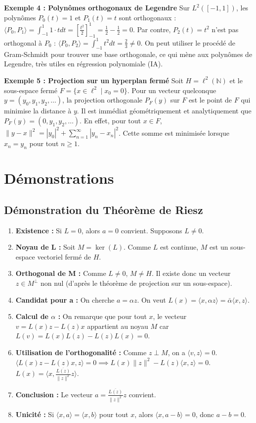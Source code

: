 \documentclass[11pt,a4paper]{article}
\begin{document}
\textbf{Exemple 4 : Polynômes orthogonaux de Legendre}
Sur $L^2([-1, 1])$, les polynômes $P_0(t) = 1$ et $P_1(t) = t$ sont orthogonaux :
$\langle P_0, P_1 \rangle = \int_{-1}^1 1 \cdot t dt = \left[ \frac{t^2}{2} \right]_{-1}^1 = \frac{1}{2} - \frac{1}{2} = 0$.
Par contre, $P_2(t) = t^2$ n'est pas orthogonal à $P_0$ : $\langle P_0, P_2 \rangle = \int_{-1}^1 t^2 dt = \frac{2}{3} \neq 0$.
On peut utiliser le procédé de Gram-Schmidt pour trouver une base orthogonale, ce qui mène aux polynômes de Legendre, très utiles en régression polynomiale (IA).

\textbf{Exemple 5 : Projection sur un hyperplan fermé}
Soit $H = \ell^2(\mathbb{N})$ et le sous-espace fermé $F = \{ x \in \ell^2 \mid x_0 = 0 \}$.
Pour un vecteur quelconque $y = (y_0, y_1, y_2, \dots)$, la projection orthogonale $P_F(y)$ sur $F$ est le point de $F$ qui minimise la distance à $y$.
Il est immédiat géométriquement et analytiquement que $P_F(y) = (0, y_1, y_2, \dots)$.
En effet, pour tout $x \in F$, $\|y - x\|^2 = |y_0|^2 + \sum_{n=1}^\infty |y_n - x_n|^2$. Cette somme est minimisée lorsque $x_n = y_n$ pour tout $n \ge 1$.


\section{Démonstrations}

\subsection{Démonstration du Théorème de Riesz}

\begin{enumerate}
\item \textbf{Existence :} Si $L = 0$, alors $a = 0$ convient. Supposons $L \neq 0$.
\item \textbf{Noyau de L :} Soit $M = \ker(L)$. Comme $L$ est continue, $M$ est un sous-espace vectoriel fermé de $H$.
\item \textbf{Orthogonal de M :} Comme $L \neq 0$, $M \neq H$. Il existe donc un vecteur $z \in M^\perp$ non nul (d'après le théorème de projection sur un sous-espace).
\item \textbf{Candidat pour a :} On cherche $a = \alpha z$. On veut $L(x) = \langle x, \alpha z \rangle = \bar{\alpha} \langle x, z \rangle$.
\item \textbf{Calcul de $\alpha$ :} On remarque que pour tout $x$, le vecteur $v = L(x)z - L(z)x$ appartient au noyau $M$ car $L(v) = L(x)L(z) - L(z)L(x) = 0$.
\item \textbf{Utilisation de l'orthogonalité :} Comme $z \perp M$, on a $\langle v, z \rangle = 0$.
   $\langle L(x)z - L(z)x, z \rangle = 0 \implies L(x) \|z\|^2 - L(z) \langle x, z \rangle = 0$.
   $L(x) = \langle x, \frac{\overline{L(z)}}{\|z\|^2} z \rangle$.
\item \textbf{Conclusion :} Le vecteur $a = \frac{\overline{L(z)}}{\|z\|^2} z$ convient.
\item \textbf{Unicité :} Si $\langle x, a \rangle = \langle x, b \rangle$ pour tout $x$, alors $\langle x, a-b \rangle = 0$, donc $a-b=0$.
\end{enumerate}
\end{document}
